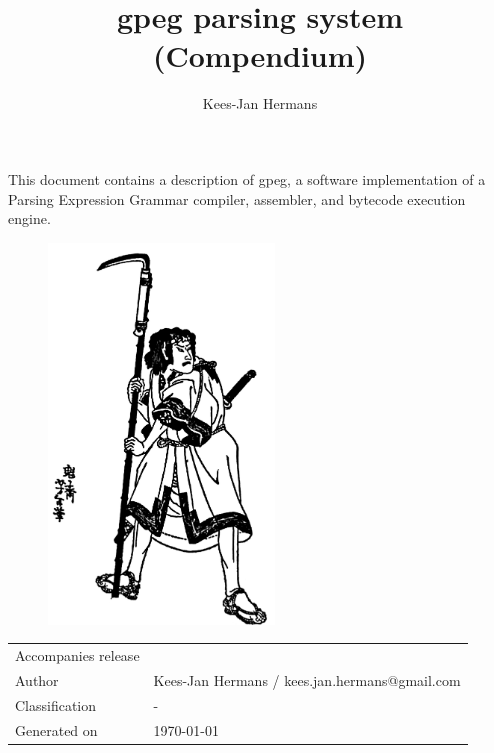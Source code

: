 \documentclass[11pt]{amsart}
\title{gpeg parsing system (Compendium)}
\author{Kees-Jan Hermans}
\begin{document}
\maketitle

This document contains a description of gpeg, a software
implementation of a Parsing Expression Grammar compiler,
assembler, and bytecode execution engine.

\vspace*{3\baselineskip}

\begin{figure}[H]
\centering
\includegraphics[width=60mm]{naigama}
\end{figure}

\vfill

\begin{table}[]
\centering
\begin{tabular}{ll}
Accompanies release &  \\
Author &  Kees-Jan Hermans / kees.jan.hermans@gmail.com \\
Classification & - \\
Generated on & \today \\
\end{tabular}
\end{table}

% 
% 
% 
\newpage

\tableofcontents

\setlength{\parindent}{4em}
\setlength{\parskip}{1em}
\end{document}
